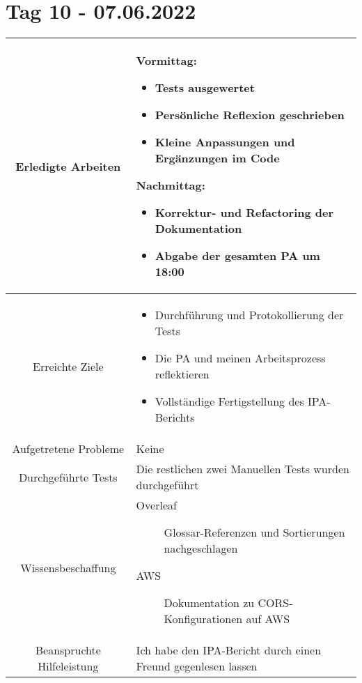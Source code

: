 \section{Tag 10 - 07.06.2022}

\begin{tabularx}{\textwidth}[H]{|c|X|}
    \hline
    Erledigte Arbeiten &
    \textbf{Vormittag:}
    \begin{itemize}
        \item Tests ausgewertet
        \item Persönliche Reflexion geschrieben
        \item Kleine Anpassungen und Ergänzungen im Code
    \end{itemize}
    \textbf{Nachmittag:}
    \begin{itemize}
        \item Korrektur- und Refactoring der Dokumentation
        \item Abgabe der gesamten PA um 18:00
    \end{itemize}
    \\ \hline

    Erreichte Ziele &
    \begin{itemize}
        \item Durchführung und Protokollierung der Tests
        \item Die PA und meinen Arbeitsprozess reflektieren
        \item Vollständige Fertigstellung des IPA-Berichts
    \end{itemize}
    \\ \hline

    Aufgetretene Probleme &
    Keine
    \\ \hline

    Durchgeführte Tests &
    Die restlichen zwei Manuellen Tests wurden durchgeführt
    \\ \hline

    Wissensbeschaffung &
    \begin{description}
        \item[Overleaf] Glossar-Referenzen und Sortierungen nachgeschlagen
        \item[AWS] Dokumentation zu CORS-Konfigurationen auf AWS
    \end{description}
    \\ \hline

    Beanspruchte Hilfeleistung &
    Ich habe den IPA-Bericht durch einen Freund gegenlesen lassen
    \\ \hline


\end{tabularx}
